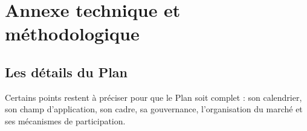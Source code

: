 \documentclass[a5paper,french,openany]{memoir}
\begin{document}


\appendix

\part*{Annexe technique et méthodologique}\label{annexe}

\chapter{Les détails du Plan\label{ch:details}} 

Certains points restent à préciser pour que le Plan soit complet : son calendrier, son champ d'application, son cadre, sa gouvernance, l'organisation du marché et ses mécanismes de participation. 
\end{document}
